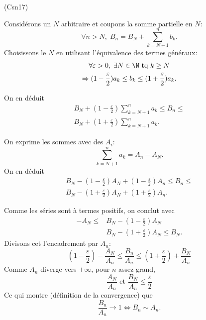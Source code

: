 \begin{tiny}(Csn17)\end{tiny} Considérons un $N$ arbitraire et coupons la somme partielle en $N$:
\[
 \forall n >N, \;
 B_n = B_N + \sum_{k = N +1}^{n} b_k .
\]
Choisissons le $N$ en utilisant l'équivalence des termes généraux:
\begin{multline*}
 \forall \varepsilon >0, \; \exists N\in \N \text{ tq }
 k\geq N \\
 \Rightarrow 
 (1-\frac{\varepsilon}{2})a_k \leq b_k \leq (1+\frac{\varepsilon}{2})a_k.
\end{multline*}

On en déduit
\begin{multline*}
 B_N + (1-\frac{\varepsilon}{2})\sum_{k=N+1}^{n}a_k
 \leq B_n \leq  \\
 B_N + (1+\frac{\varepsilon}{2})\sum_{k=N+1}^{n}a_k.
\end{multline*}

On exprime les sommes avec des $A_i$:
\[
 \sum_{k=N+1}^{n}a_k = A_n - A_N.
\]
On en déduit
\begin{multline*}
 B_N - (1-\frac{\varepsilon}{2})A_N + (1-\frac{\varepsilon}{2})A_n 
 \leq B_n \leq  \\
 B_N - (1+\frac{\varepsilon}{2})A_N + (1+\frac{\varepsilon}{2})A_n.
\end{multline*}

Comme les séries sont à termes positifs, on conclut avec
\begin{align*}
 -A_N \leq &B_N - (1-\frac{\varepsilon}{2})A_N \\
 &B_N - (1+\frac{\varepsilon}{2})A_N \leq B_N .
\end{align*}
Divisons cet l'encadrement par $A_n$:
\[
 (1-\frac{\varepsilon}{2}) - \frac{A_N}{A_n}
 \leq \frac{B_n}{A_n} \leq
 (1+\frac{\varepsilon}{2}) + \frac{B_N}{A_n}
\]
Comme $A_n$ diverge vers $+\infty$, pour $n$ assez grand,
\[
 \frac{A_N}{A_n} \text{ et } \frac{B_N}{A_n}\leq \frac{\varepsilon}{2} 
\]
Ce qui montre (définition de la convergence) que
\[
 \frac{B_n}{A_n}\rightarrow 1 \Leftrightarrow B_n \sim A_n.
\]
